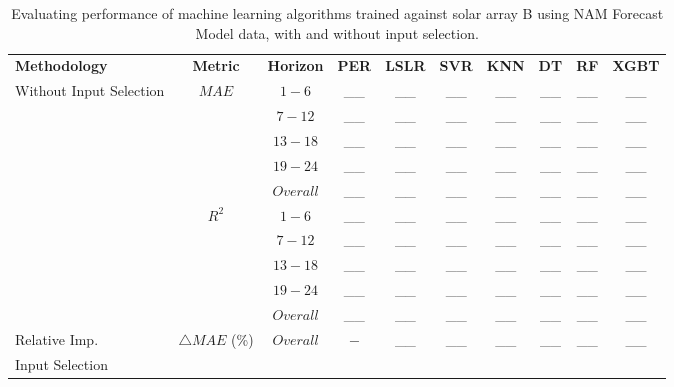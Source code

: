 \begin{table}[h]
\begin{center}
    \caption{Evaluating performance of machine learning algorithms trained against solar array B using NAM Forecast Model data, with and without input selection.}
    \vspace{0.2cm}
    \begin{tabular}{@{}p{5.3em}ccccccccc@{}}
    \toprule
    \textbf{Methodology} & \textbf{Metric} & \textbf{Horizon} & \textbf{PER} & \textbf{LSLR} & \textbf{SVR} & \textbf{KNN} & \textbf{DT} & \textbf{RF} & \textbf{XGBT} \\ \cmidrule(l){1-10} 
    \multirow{10}{5em}{Without Input Selection} & \multirow{5}{*}{$MAE$} & $1 - 6$ & \_\_ & \_\_ & \_\_ & \_\_ & \_\_ & \_\_ & \_\_ \\
                                              &                   & $7 - 12$ & \_\_ & \_\_ & \_\_ & \_\_ & \_\_ & \_\_ & \_\_ \\
                                              &                   & $13 - 18$ & \_\_ & \_\_ & \_\_ & \_\_ & \_\_ & \_\_ & \_\_ \\
                                              &                   & $19 - 24$ & \_\_ & \_\_ & \_\_ & \_\_ & \_\_ & \_\_ & \_\_ \\
                                              &                   & $Overall$ & \_\_ & \_\_ & \_\_ & \_\_ & \_\_ & \_\_ & \_\_ \\ \cmidrule(lr){2-10}
                                              & \multirow{5}{*}{$R^2$} & $1 - 6$ & \_\_ & \_\_ & \_\_ & \_\_ & \_\_ & \_\_ & \_\_ \\
                                              &                   & $7 - 12$ & \_\_ & \_\_ & \_\_ & \_\_ & \_\_ & \_\_ & \_\_ \\
                                              &                   & $13 - 18$ & \_\_ & \_\_ & \_\_ & \_\_ & \_\_ & \_\_ & \_\_ \\
                                              &                   & $19 - 24$ & \_\_ & \_\_ & \_\_ & \_\_ & \_\_ & \_\_ & \_\_ \\
                                              &                   & $Overall$ & \_\_ & \_\_ & \_\_ & \_\_ & \_\_ & \_\_ & \_\_ \\ 
    \midrule
    Relative Imp. & $\bigtriangleup MAE$ (\%)  & $Overall$ & $-$ & \_\_ & \_\_ & \_\_ & \_\_ & \_\_ & \_\_ \\ 
    \midrule
    \multirow{10}{5em}{Input Selection}

\end{tabular}
\end{center}
\end{table}

